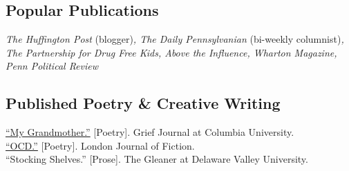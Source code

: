 \documentclass[10pt, letterpaper]{article}
\begin{document}
\subsection*{Popular Publications}
\noindent
\textit{The Huffington Post }(blogger)\textit{, The Daily Pennsylvanian }(bi-weekly columnist)\textit{,
The Partnership for Drug Free Kids, Above the Influence, Wharton Magazine, Penn Political Review}\\

\subsection*{Published Poetry \& Creative Writing}
\noindent
\href{http://www.thegriefdiaries.org/poetry-by-theodore-caputi}{“My Grandmother.”} [Poetry]. Grief Journal at Columbia University.\\[.2cm]
\href{http://www.londonjournaloffiction.com/poems-january-2016/ocd}{“OCD.”} [Poetry]. London Journal of Fiction.\\[.2cm]
“Stocking Shelves.” [Prose]. The Gleaner at Delaware Valley University.\\[.2cm]

\end{document}
